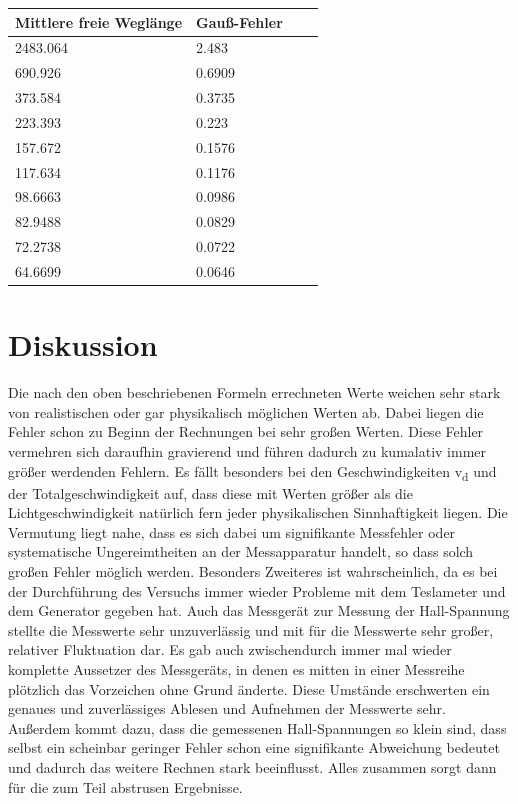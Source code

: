 \documentclass[titlepage=firstcover, captions=tableheading]{scrartcl}
\begin{document}
\begin{center}
    \begin{tabular}{l @{${}\pm{}$}lll}\\
    \toprule
    Mittlere freie Weglänge & Gauß-Fehler\\
    \midrule
    2483.064  & 2.483 \\
     690.926  & 0.6909    \\
     373.584  & 0.3735     \\
     223.393  & 0.223 \\
     157.672  & 0.1576  \\
     117.634  & 0.1176 \\
     98.6663  & 0.0986 \\
     82.9488  & 0.0829 \\
     72.2738  & 0.0722  \\
     64.6699  & 0.0646 \\
    \bottomrule
    \end{tabular}
\end{center}

\section{Diskussion}
Die nach den oben beschriebenen Formeln errechneten Werte weichen sehr stark von realistischen oder gar physikalisch möglichen Werten ab. Dabei liegen die Fehler schon zu Beginn der Rechnungen bei sehr großen Werten. Diese Fehler vermehren sich daraufhin gravierend und führen dadurch zu kumalativ immer größer werdenden Fehlern. Es fällt besonders bei den Geschwindigkeiten v\textsubscript{d} und der Totalgeschwindigkeit auf, dass diese mit Werten größer als die Lichtgeschwindigkeit natürlich fern jeder physikalischen Sinnhaftigkeit liegen. Die Vermutung liegt nahe, dass es sich dabei um signifikante Messfehler oder systematische Ungereimtheiten an der Messapparatur handelt, so dass solch großen Fehler möglich werden. Besonders Zweiteres ist wahrscheinlich, da es bei der Durchführung des Versuchs immer wieder Probleme mit dem Teslameter und dem Generator gegeben hat. Auch das Messgerät zur Messung der Hall-Spannung stellte die Messwerte sehr unzuverlässig und mit für die Messwerte sehr großer, relativer Fluktuation dar. Es gab auch zwischendurch immer mal wieder komplette Aussetzer des Messgeräts, in denen es mitten in einer Messreihe plötzlich das Vorzeichen ohne Grund änderte. Diese Umstände erschwerten ein genaues und zuverlässiges Ablesen und Aufnehmen der Messwerte sehr. Außerdem kommt dazu, dass die gemessenen Hall-Spannungen so klein sind, dass selbst ein scheinbar geringer Fehler schon eine signifikante Abweichung bedeutet und dadurch das weitere Rechnen stark beeinflusst. Alles zusammen sorgt dann für die zum Teil abstrusen Ergebnisse.
\end{document}
